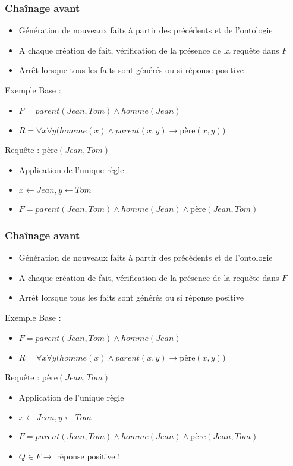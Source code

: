 \begin{frame}
	\frametitle{Chaînage avant}
	\begin{itemize}
		\item Génération de nouveaux faits à partir des précédents et de l'ontologie
		\item A chaque création de fait, vérification de la présence de la requête dans
		$F$
		\item Arrêt lorsque tous les faits sont générés ou si réponse positive
	\end{itemize}

	\begin{exampleblock}{Exemple}
	Base :
	\begin{itemize}
		\item $F = parent(Jean,Tom) \wedge homme(Jean)$
		\item $R = \forall x \forall y (homme(x) \wedge parent(x,y) \rightarrow
		$père$(x,y))$
	\end{itemize}
	Requête : père$(Jean,Tom)$
	\begin{itemize}
		\item Application de l'unique règle 
		\item $x \leftarrow Jean, y \leftarrow Tom$
		\item $F = parent(Jean,Tom) \wedge homme(Jean) \wedge $père$(Jean,Tom)$
	\end{itemize}
	\end{exampleblock}
\end{frame}


\begin{frame}
	\frametitle{Chaînage avant}
	\begin{itemize}
		\item Génération de nouveaux faits à partir des précédents et de l'ontologie
		\item A chaque création de fait, vérification de la présence de la requête dans
		$F$
		\item Arrêt lorsque tous les faits sont générés ou si réponse positive
	\end{itemize}

	\begin{exampleblock}{Exemple}
	Base :
	\begin{itemize}
		\item $F = parent(Jean,Tom) \wedge homme(Jean)$
		\item $R = \forall x \forall y (homme(x) \wedge parent(x,y) \rightarrow
		$père$(x,y))$
	\end{itemize}
	Requête : père$(Jean,Tom)$
	\begin{itemize}
		\item Application de l'unique règle
		\item $x \leftarrow Jean, y \leftarrow Tom$
		\item $F = parent(Jean,Tom) \wedge homme(Jean) \wedge $père$(Jean,Tom)$
		\item $Q \in F \rightarrow$ réponse positive !
	\end{itemize}
	\end{exampleblock}
\end{frame}

